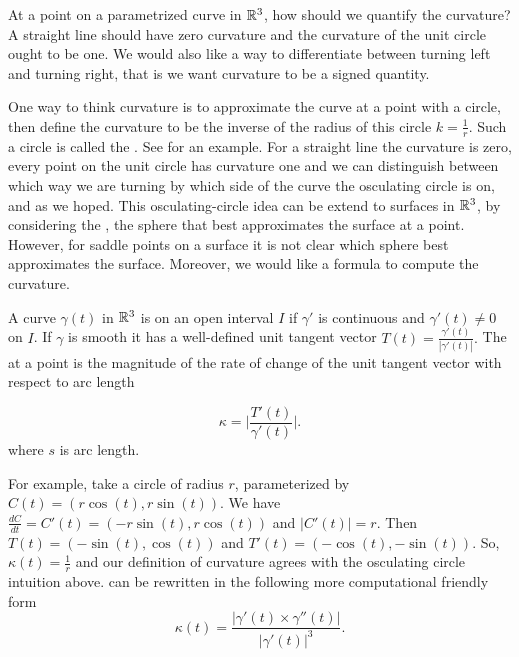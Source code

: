 

At a point on a parametrized curve  in $\mathbb{R}^3$,
how should we quantify the curvature?
A straight line should have zero curvature and the curvature of the unit circle ought to be one.
We would also like a way to differentiate
between turning left and turning right, that is we want curvature to be a signed quantity.

One way to think curvature is to approximate the curve at a point with a circle,
then define the curvature to be the inverse of the radius of this circle $k=\frac{1}{r}$.
Such a circle is called the .
See  for an example.
For a straight line the curvature is zero, 
every point on the unit circle has curvature one 
and we can distinguish between
which way we are turning by which side of the curve the osculating circle is on,
 and as we hoped.
 This osculating-circle idea can be extend
to  surfaces in $\mathbb{R}^3$, by considering the ,
 the sphere that best approximates the surface at a point.
However, for saddle points on a surface it is not clear which sphere
best approximates the surface. Moreover, we would like a formula to compute the curvature.

A curve $\gamma(t)$ in $\mathbb{R}^3$ is  on an open interval $I$
if $\gamma'$ is continuous and $\gamma'(t)\neq 0$ on $I$. 
If $\gamma$ is smooth it has a well-defined unit tangent vector $T(t)=\frac{\gamma'(t)}{|\gamma'(t)|}.$
The  at a point is the magnitude of the rate of change of the unit tangent vector with 
respect to arc length

\begin{equation} \label{eqn:kappa}
\kappa=\bigg  | \frac{T'(t)}{\gamma'(t)}\bigg |.
\end{equation}
where $s$ is arc length.

For example, take a circle of radius $r$, parameterized by $C(t)=\left(r\cos(t),r\sin(t)\right)$.
We have $\frac{dC}{dt}=C'(t)=\left(-r\sin(t),r\cos(t)\right)$ and $|C'(t)|=r$.
Then $T(t)=\left(-\sin(t),\cos(t)\right)$ and $T'(t)=\left(-\cos(t),-\sin(t)\right)$.
So, $\kappa(t)=\frac{1}{r}$ and our definition of curvature agrees with the
osculating circle intuition above. 
 can be rewritten in the following more computational friendly form 
\begin{equation} \label{eqn:kappa1}
\kappa(t)=\frac{|\gamma'(t)\times \gamma''(t)|}{|\gamma'(t)|^3}.
\end{equation}

